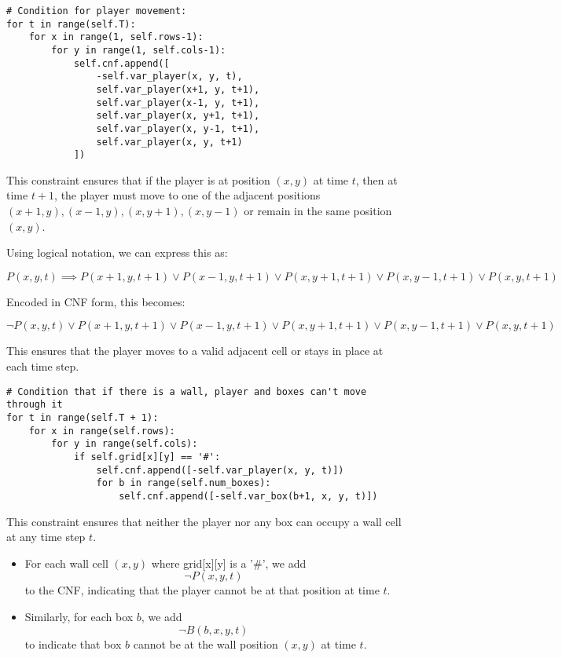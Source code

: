 \documentclass[12pt,a4paper]{article}
\begin{document}
\begin{lstlisting}
# Condition for player movement:
for t in range(self.T):
    for x in range(1, self.rows-1):
        for y in range(1, self.cols-1):
            self.cnf.append([
                -self.var_player(x, y, t),
                self.var_player(x+1, y, t+1),
                self.var_player(x-1, y, t+1),
                self.var_player(x, y+1, t+1),
                self.var_player(x, y-1, t+1),
                self.var_player(x, y, t+1)
            ])
\end{lstlisting}

This constraint ensures that if the player is at position \((x,y)\) at time \(t\), then at time \(t+1\), the player must move to one of the adjacent positions \((x+1,y), (x-1,y), (x,y+1), (x,y-1)\) or remain in the same position \((x,y)\).

Using logical notation, we can express this as:

\[
P(x,y,t) \implies P(x+1,y,t+1) \lor P(x-1,y,t+1) \lor P(x,y+1,t+1) \lor P(x,y-1,t+1) \lor P(x,y,t+1)
\]

Encoded in CNF form, this becomes:

\[
\neg P(x,y,t) \lor P(x+1,y,t+1) \lor P(x-1,y,t+1) \lor P(x,y+1,t+1) \lor P(x,y-1,t+1) \lor P(x,y,t+1)
\]

\noindent This ensures that the player moves to a valid adjacent cell or stays in place at each time step.
\newpage



\begin{lstlisting}
# Condition that if there is a wall, player and boxes can't move through it
for t in range(self.T + 1):
    for x in range(self.rows):
        for y in range(self.cols):
            if self.grid[x][y] == '#':
                self.cnf.append([-self.var_player(x, y, t)])
                for b in range(self.num_boxes):
                    self.cnf.append([-self.var_box(b+1, x, y, t)])
\end{lstlisting}

This constraint ensures that neither the player nor any box can occupy a wall cell at any time step \(t\).  

\begin{itemize}
    \item For each wall cell \((x,y)\) where grid[x][y] is a '\#', we add 
    \[
    \neg P(x,y,t)
    \] 
    to the CNF, indicating that the player cannot be at that position at time \(t\).  

    \item Similarly, for each box \(b\), we add 
    \[
    \neg B(b,x,y,t)
    \] 
    to indicate that box \(b\) cannot be at the wall position \((x,y)\) at time \(t\).  
\end{itemize}
\end{document}
